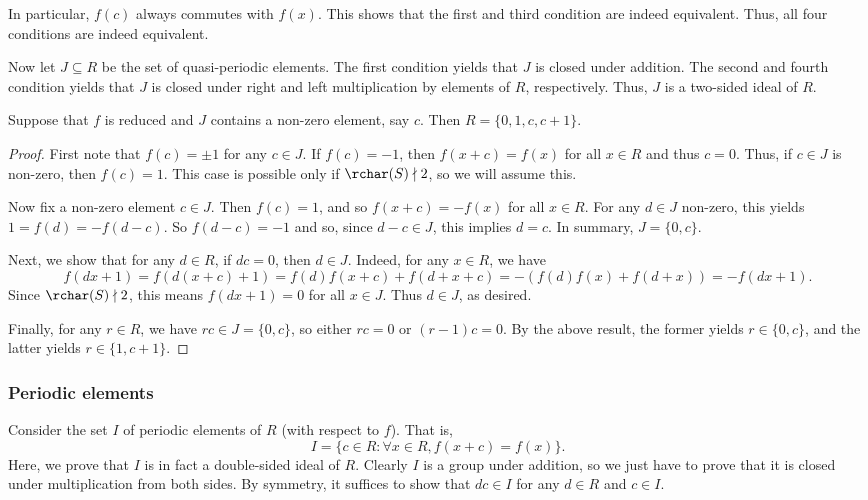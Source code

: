 In particular, $f(c)$ always commutes with $f(x)$.
This shows that the first and third condition are indeed equivalent.
Thus, all four conditions are indeed equivalent.

Now let $J \subseteq R$ be the set of quasi-periodic elements.
The first condition yields that $J$ is closed under addition.
The second and fourth condition yields that $J$ is closed under right and left multiplication by elements of $R$, respectively.
Thus, $J$ is a two-sided ideal of $R$.

\begin{lemma}\label{2012a5-quasi-periodic-non-zero}
Suppose that $f$ is reduced and $J$ contains a non-zero element, say $c$.
Then $R = \{0, 1, c, c + 1\}$.
\end{lemma}
\begin{proof}
First note that $f(c) = \pm 1$ for any $c \in J$.
If $f(c) = -1$, then $f(x + c) = f(x)$ for all $x \in R$ and thus $c = 0$.
Thus, if $c \in J$ is non-zero, then $f(c) = 1$.
This case is possible only if $\rchar(S) \nmid 2$, so we will assume this.

Now fix a non-zero element $c \in J$.
Then $f(c) = 1$, and so $f(x + c) = -f(x)$ for all $x \in R$.
For any $d \in J$ non-zero, this yields $1 = f(d) = -f(d - c)$.
So $f(d - c) = -1$ and so, since $d - c \in J$, this implies $d = c$.
In summary, $J = \{0, c\}$.

Next, we show that for any $d \in R$, if $dc = 0$, then $d \in J$.
Indeed, for any $x \in R$, we have
\[ f(dx + 1) = f(d(x + c) + 1) = f(d) f(x + c) + f(d + x + c) = -(f(d) f(x) + f(d + x)) = -f(dx + 1). \]
Since $\rchar(S) \nmid 2$, this means $f(dx + 1) = 0$ for all $x \in J$.
Thus $d \in J$, as desired.

Finally, for any $r \in R$, we have $rc \in J = \{0, c\}$, so either $rc = 0$ or $(r - 1)c = 0$.
By the above result, the former yields $r \in \{0, c\}$, and the latter yields $r \in \{1, c + 1\}$.
\end{proof}



\subsubsection*{Periodic elements}

Consider the set $I$ of periodic elements of $R$ (with respect to $f$).
That is, \[ I = \{c \in R : \forall x \in R, f(x + c) = f(x)\}. \]
Here, we prove that $I$ is in fact a double-sided ideal of $R$.
Clearly $I$ is a group under addition, so we just have to prove that it is closed under multiplication from both sides.
By symmetry, it suffices to show that $dc \in I$ for any $d \in R$ and $c \in I$.

